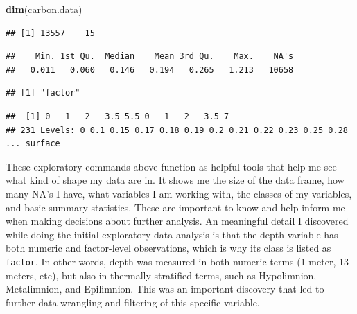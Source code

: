 \documentclass[12pt,]{article}
\newenvironment{Shaded}{\begin{snugshade}}{\end{snugshade}}
\newcommand{\KeywordTok}[1]{\textcolor[rgb]{0.13,0.29,0.53}{\textbf{#1}}}
\newcommand{\DecValTok}[1]{\textcolor[rgb]{0.00,0.00,0.81}{#1}}
\newcommand{\OperatorTok}[1]{\textcolor[rgb]{0.81,0.36,0.00}{\textbf{#1}}}
\newcommand{\NormalTok}[1]{#1}
\begin{document}
\begin{Shaded}
\begin{Highlighting}[]
\KeywordTok{dim}\NormalTok{(carbon.data)}
\end{Highlighting}
\end{Shaded}

\begin{verbatim}
## [1] 13557    15
\end{verbatim}

\begin{Shaded}
\end{Shaded}

\begin{verbatim}
##    Min. 1st Qu.  Median    Mean 3rd Qu.    Max.    NA's 
##   0.011   0.060   0.146   0.194   0.265   1.213   10658
\end{verbatim}

\begin{Shaded}
\end{Shaded}

\begin{verbatim}
## [1] "factor"
\end{verbatim}

\begin{Shaded}
\end{Shaded}

\begin{verbatim}
##  [1] 0   1   2   3.5 5.5 0   1   2   3.5 7  
## 231 Levels: 0 0.1 0.15 0.17 0.18 0.19 0.2 0.21 0.22 0.23 0.25 0.28 ... surface
\end{verbatim}

These exploratory commands above function as helpful tools that help me
see what kind of shape my data are in. It shows me the size of the data
frame, how many NA's I have, what variables I am working with, the
classes of my variables, and basic summary statistics. These are
important to know and help inform me when making decisions about further
analysis. An meaningful detail I discovered while doing the initial
exploratory data analysis is that the depth variable has both numeric
and factor-level observations, which is why its class is listed as
\texttt{factor}. In other words, depth was measured in both numeric
terms (1 meter, 13 meters, etc), but also in thermally stratified terms,
such as Hypolimnion, Metalimnion, and Epilimnion. This was an important
discovery that led to further data wrangling and filtering of this
specific variable.
\end{document}
